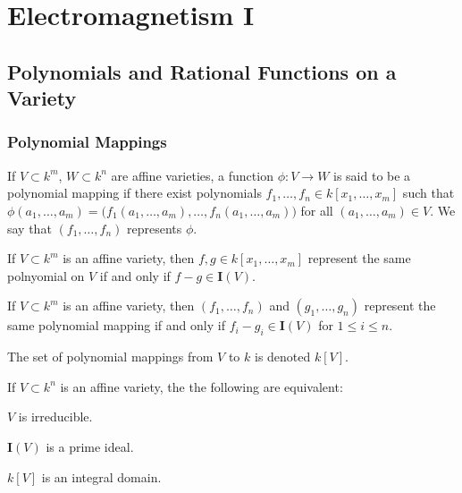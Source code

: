 \documentclass[crop=false,class=article,oneside]{standalone}
\begin{document}
    \ifx\ifgeoalg\undefined
        \section*{Electromagnetism I}
        \setcounter{section}{1}
    \fi
    \subsection{Polynomials and Rational Functions on a Variety}
    \subsubsection{Polynomial Mappings}
    \begin{definition}
    If $V\subset k^m$, $W\subset k^n$ are affine varieties, a function $\phi:V\rightarrow W$ is said to be a polynomial mapping if there exist polynomials $f_1,\hdots, f_n\in k[x_1,\hdots, x_m]$ such that $\phi(a_1,\hdots, a_m) = \big(f_1(a_1,\hdots, a_m),\hdots, f_n(a_1,\hdots, a_m)\big)$ for all $(a_1,\hdots, a_m) \in V$. We say that $(f_1,\hdots, f_n)$ represents $\phi$.
    \end{definition}
    \begin{theorem}
    If $V\subset k^m$ is an affine variety, then $f,g\in k[x_1,\hdots, x_m]$ represent the same polnyomial on $V$ if and only if $f-g \in \textbf{I}(V)$.
    \end{theorem}
    \begin{theorem}
    If $V\subset k^m$ is an affine variety, then $(f_1,\hdots, f_n)$ and $(g_1,\hdots, g_n)$ represent the same polynomial mapping if and only if $f_i-g_i \in \textbf{I}(V)$ for $1\leq i \leq n$.
    \end{theorem}
    \begin{notation}
    The set of polynomial mappings from $V$ to $k$ is denoted $k[V]$.
    \end{notation}
    \begin{theorem}
    If $V\subset k^n$ is an affine variety, the the following are equivalent:
    \begin{enumerate}
    \begin{multicols}{3}
        \item $V$ is irreducible.
        \item $\textbf{I}(V)$ is a prime ideal.
        \item $k[V]$ is an integral domain.
    \end{multicols}
    \end{enumerate}
    \end{theorem}
\end{document}
